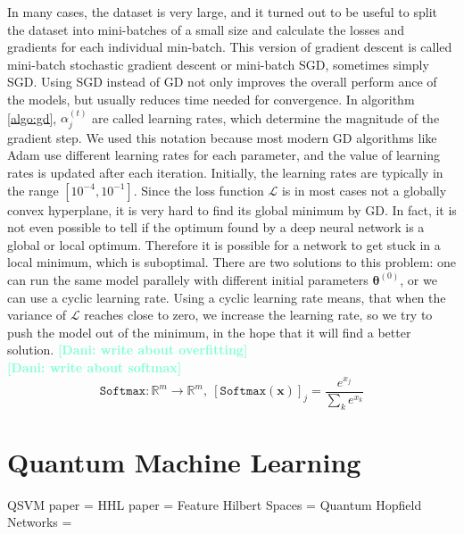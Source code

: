 \documentclass[12pt, a4paper,  nobibnotes]{article}
\newcommand{\nd}[1]{\textcolor{Aquamarine}{\textbf{[Dani: #1]}}}
\begin{document}
In many cases, the dataset is very large, and it turned out to be useful to split the dataset 
into mini-batches of a small size and calculate the losses and gradients for each individual 
min-batch. This version of gradient descent is called mini-batch stochastic gradient descent or 
mini-batch SGD, sometimes simply SGD. Using SGD instead of GD not only improves the overall perform
ance of the models, but usually reduces time needed for convergence.
In algorithm \ref{algo:gd}, $\alpha_j^{(t)}$ are called learning rates, which determine the 
magnitude of the gradient step. We used this notation because most modern GD algorithms like 
Adam \cite{Kingma2015AdamAM} use different learning rates for each parameter, and the 
value of learning rates is updated after each iteration. Initially, the learning rates are 
typically in the range $[10^{-4},10^{-1}]$.
Since the loss function $\mathcal L$ is in most cases not a globally convex hyperplane, it is 
very hard to find its global minimum by GD. In fact, it is not even possible to tell if the 
optimum found by a deep neural network is a global or local optimum. Therefore it is possible
for a network to get stuck in a local minimum, which is suboptimal. There are two solutions to 
this problem: one can run the same model parallely with different initial parameters $\pmb\theta^{(0)}$,
or we can use a cyclic learning rate. Using a cyclic learning rate means, that when the 
variance of $\mathcal L$ reaches close to zero, we increase the learning rate, so we try to 
push the model out of the minimum, in the hope that it will find a better solution.
\nd{write about overfitting}\\
\nd{write about softmax}
\begin{equation}
    \texttt{Softmax}:\mathbb R^m \rightarrow \mathbb R^m,~\left[\texttt{Softmax}(\mathbf x)\right]_j = \frac{e^{x_j}}{\sum\limits_ke^{x_k}}
    \label{eq:softmax}
\end{equation}

\section{Quantum Machine Learning}
QSVM paper = \cite{QSVMPaper}
HHL paper = \cite{HHLPaper}
Feature Hilbert Spaces = \cite{FeatureHilbertSpaces}
Quantum Hopfield Networks = \cite{QuantumHopfield}
\end{document}
